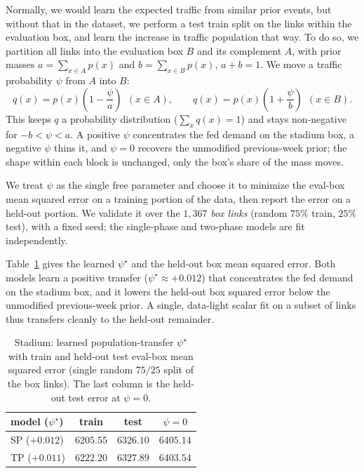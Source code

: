 \documentclass[sigconf, review]{acmart}
\begin{document}
Normally, we would learn the expected traffic from similar prior events, but without that in the dataset, we perform a test train split on the links within the evaluation box, and learn the increase in traffic population that way.
To do so, we partition all links into the
evaluation box $B$ and its complement $A$, with prior masses
$a=\sum_{x\in A}p(x)$ and $b=\sum_{x\in B}p(x)$, $a+b=1$. We move a traffic probability
$\psi$ from $A$ into $B$:
\[
q(x)=p(x)\left(1-\frac{\psi}{a}\right)\ \ (x\in A),
\qquad
q(x)=p(x)\left(1+\frac{\psi}{b}\right)\ \ (x\in B).
\]
This keeps $q$ a probability distribution ($\sum_x q(x)=1$) and stays
non-negative for $-b<\psi<a$. A positive $\psi$ concentrates the fed
demand on the stadium box, a negative $\psi$ thins it, and $\psi=0$
recovers the unmodified previous-week prior; the shape within each block
is unchanged, only the box's share of the mass moves.

We treat $\psi$ as the single free parameter and choose it to minimize the
eval-box mean squared error on a training portion of the data, then report
the error on a held-out portion. We validate it over the $1{,}367$
\emph{box links} (random $75\%$ train, $25\%$ test), with a fixed seed; the
single-phase and two-phase models are fit independently.

Table~\ref{tab:stadium-psi} gives the learned $\psi^\star$ and the
held-out box mean squared error. Both models learn a positive transfer
($\psi^\star\approx+0.012$) that concentrates the fed demand on the stadium
box, and it lowers the held-out box squared error below the unmodified
previous-week prior. A single, data-light scalar fit on a subset of links
thus transfers cleanly to the held-out remainder.

\begin{table}[t]
\centering
\caption{Stadium: learned population-transfer $\psi^\star$ with train and
held-out test eval-box mean squared error (single random
$75/25$ split of the box links). The last column is the held-out test error
at $\psi=0$.}
\label{tab:stadium-psi}
\setlength{\tabcolsep}{8pt}
\begin{tabular}{lccc}
\toprule
model ($\psi^\star$) & train & test & $\psi{=}0$ \\
\midrule
SP ($+0.012$) & $6205.55$ & $6326.10$ & $6405.14$ \\
TP ($+0.011$) & $6222.20$ & $6327.89$ & $6403.54$ \\
\bottomrule
\end{tabular}
\end{table}
\end{document}
